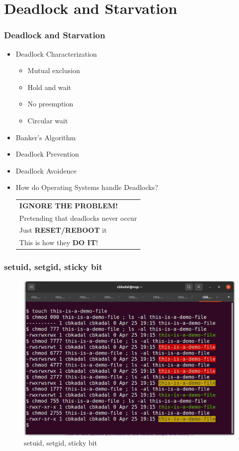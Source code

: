 \documentclass[xcolor=table, notheorems, hyperref={pdfpagelabels=false}]{beamer}
\begin{document}
\section{Deadlock and Starvation}
\begin{frame}[fragile]
\frametitle{Deadlock and Starvation}

\begin{itemize}
\item Deadlock Characterization
\begin{itemize}
\item Mutual exclusion
\item Hold and wait
\item No preemption
\item Circular wait
\end{itemize}

\item Banker's Algorithm

\item Deadlock Prevention

\item Deadlock Avoidence

\item How do Operating Systems handle Deadlocks?
\\ [3mm]

\begin{tabular}{|l|}
\hline
\textbf{IGNORE THE PROBLEM!}\\
Pretending that deadlocks never occur \\
Just \textbf{RESET/REBOOT} it\\
This is how they \textbf{DO IT}! \\
\hline
\end{tabular}

\end{itemize}
\end{frame}


\begin{frame}[fragile]
\frametitle{setuid, setgid, sticky bit}

\begin{figure}
\includegraphics[width=0.82\linewidth]{os-set-ug-id}
\caption{setuid, setgid, sticky bit}
\end{figure}

\end{frame}
\end{document}
